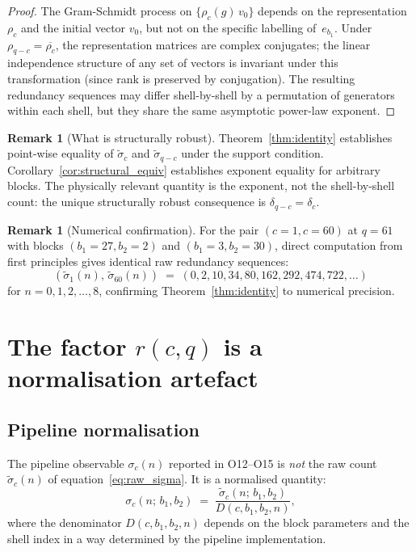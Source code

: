 \documentclass[11pt,a4paper]{article}
\theoremstyle{definition}
\newtheorem{remark}[theorem]{Remark}
\begin{document}
      \begin{proof}
        The Gram-Schmidt process on $\{\rho_c(g)\,v_0\}$ depends on
        the representation $\rho_c$ and the initial vector $v_0$, but not
        on the specific labelling of~$e_{b_1}$.
        Under $\rho_{q-c} = \overline{\rho_c}$, the representation matrices
        are complex conjugates; the linear independence structure of any
        set of vectors is invariant under this transformation
        (since rank is preserved by conjugation).
        The resulting redundancy sequences may differ shell-by-shell by
        a permutation of generators within each shell, but they share the
        same asymptotic power-law exponent.
      \end{proof}

      \begin{remark}[What is structurally robust]
Theorem~\ref{thm:identity} establishes point-wise equality of
$\tilde\sigma_c$ and $\tilde\sigma_{q-c}$ under the support condition.
Corollary~\ref{cor:structural_equiv} establishes exponent equality
for arbitrary blocks.
The physically relevant quantity is the exponent, not the
shell-by-shell count: the unique structurally robust consequence
is $\delta_{q-c} = \delta_c$.
      \end{remark}

      \begin{remark}[Numerical confirmation]
For the pair $(c=1, c=60)$ at $q=61$ with blocks
$(b_1=27, b_2=2)$ and $(b_1=3, b_2=30)$, direct computation
from first principles gives identical raw redundancy sequences:
\[
  (\tilde\sigma_1(n),\, \tilde\sigma_{60}(n)) \;=\;
  (0, 2, 10, 34, 80, 162, 292, 474, 722, \ldots)
\]
for $n = 0, 1, 2, \ldots, 8$, confirming Theorem~\ref{thm:identity}
to numerical precision.
      \end{remark}

  \section{The factor $r(c,q)$ is a normalisation artefact}
    \label{sec:r_artefact}

    \subsection{Pipeline normalisation}

      The pipeline observable $\sigma_c(n)$ reported in O12--O15 is
      \emph{not} the raw count $\tilde\sigma_c(n)$ of
      equation~\eqref{eq:raw_sigma}.
      It is a normalised quantity:
      \begin{equation}
        \sigma_c(n;\, b_1, b_2)
        \;=\; \frac{\tilde\sigma_c(n;\, b_1, b_2)}{D(c, b_1, b_2, n)},
        \label{eq:sigma_normalised}
      \end{equation}
      where the denominator $D(c, b_1, b_2, n)$ depends on the block
      parameters and the shell index in a way determined by the
      pipeline implementation.
\end{document}
